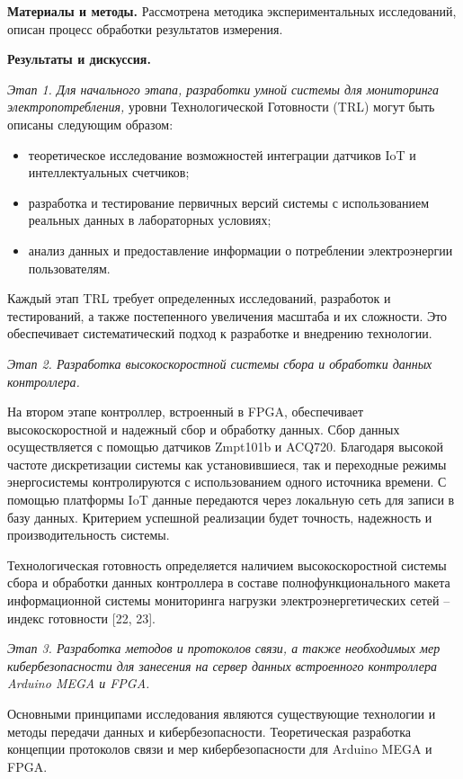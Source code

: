 {\bfseries Материалы и методы.} Рассмотрена методика экспериментальных
исследований, описан процесс обработки результатов измерения.

{\bfseries Результаты и дискуссия.}

\emph{Этап 1. Для начального этапа, разработки умной системы для
мониторинга электропотребления,} уровни Технологической Готовности (TRL)
могут быть описаны следующим образом:

\begin{itemize}
\item
  теоретическое исследование возможностей интеграции датчиков IoT и
  интеллектуальных счетчиков;
\item
  разработка и тестирование первичных версий системы с использованием
  реальных данных в лабораторных условиях;
\item
  анализ данных и предоставление информации о потреблении электроэнергии
  пользователям.
\end{itemize}

Каждый этап TRL требует определенных исследований, разработок и
тестирований, а также постепенного увеличения масштаба и их сложности.
Это обеспечивает систематический подход к разработке и внедрению
технологии.

\emph{Этап 2. Разработка высокоскоростной системы сбора и обработки
данных контроллера.}

На втором этапе контроллер, встроенный в FPGA, обеспечивает
высокоскоростной и надежный сбор и обработку данных. Сбор данных
осуществляется с помощью датчиков Zmpt101b и ACQ720. Благодаря высокой
частоте дискретизации системы как установившиеся, так и переходные
режимы энергосистемы контролируются с использованием одного источника
времени. С помощью платформы IoT данные передаются через локальную сеть
для записи в базу данных. Критерием успешной реализации будет точность,
надежность и производительность системы.

Технологическая готовность определяется наличием высокоскоростной
системы сбора и обработки данных контроллера в составе
полнофункционального макета информационной системы мониторинга нагрузки
электроэнергетических сетей -- индекс готовности {[}22, 23{]}.

\emph{Этап 3. Разработка методов и протоколов связи, а также необходимых
мер кибербезопасности для занесения на сервер данных встроенного
контроллера Arduino MEGA и FPGA.}

Основными принципами исследования являются существующие технологии и
методы передачи данных и кибербезопасности. Теоретическая разработка
концепции протоколов связи и мер кибербезопасности для Arduino MEGA и
FPGA.

